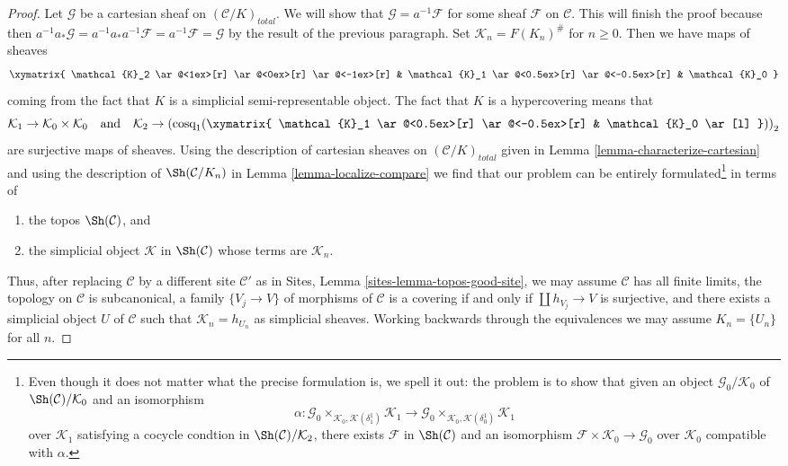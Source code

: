 \begin{proof}
\medskip\noindent
Let $\mathcal{G}$ be a cartesian sheaf on $(\mathcal{C}/K)_{total}$.
We will show that $\mathcal{G} = a^{-1}\mathcal{F}$ for some sheaf
$\mathcal{F}$ on $\mathcal{C}$. This will finish the proof because
then $a^{-1}a_*\mathcal{G} = a^{-1}a_*a^{-1}\mathcal{F} =
a^{-1}\mathcal{F} = \mathcal{G}$ by the result of the previous paragraph.
Set $\mathcal{K}_n = F(K_n)^\#$ for $n \geq 0$. Then we have maps of sheaves
$$
\xymatrix{
\mathcal{K}_2
\ar@<1ex>[r]
\ar@<0ex>[r]
\ar@<-1ex>[r]
&
\mathcal{K}_1
\ar@<0.5ex>[r]
\ar@<-0.5ex>[r]
&
\mathcal{K}_0
}
$$
coming from the fact that $K$ is a simplicial semi-representable object.
The fact that $K$ is a hypercovering means that
$$
\mathcal{K}_1 \to \mathcal{K}_0 \times \mathcal{K}_0
\quad\text{and}\quad
\mathcal{K}_2 \to
\left(\text{cosq}_1(
\xymatrix{
\mathcal{K}_1
\ar@<0.5ex>[r]
\ar@<-0.5ex>[r]
&
\mathcal{K}_0 \ar[l]
})\right)_2
$$
are surjective maps of sheaves. Using the description of cartesian sheaves on
$(\mathcal{C}/K)_{total}$ given in Lemma \ref{lemma-characterize-cartesian}
and using the description of $\Sh(\mathcal{C}/K_n)$ in
Lemma \ref{lemma-localize-compare}
we find that our problem can be entirely formulated\footnote{Even though it
does not matter what the precise formulation is, we spell it out:
the problem is to show that given an object
$\mathcal{G}_0/\mathcal{K}_0$ of $\Sh(\mathcal{C})/\mathcal{K}_0$
and an isomorphism
$$
\alpha :
\mathcal{G}_0 \times_{\mathcal{K}_0, \mathcal{K}(\delta^1_1)} \mathcal{K}_1 \to
\mathcal{G}_0 \times_{\mathcal{K}_0, \mathcal{K}(\delta^1_0)} \mathcal{K}_1
$$
over $\mathcal{K}_1$ satisfying a cocycle condtion in
$\Sh(\mathcal{C})/\mathcal{K}_2$, there exists
$\mathcal{F}$ in $\Sh(\mathcal{C})$ and an isomorphism
$\mathcal{F} \times \mathcal{K}_0 \to \mathcal{G}_0$ over $\mathcal{K}_0$
compatible with $\alpha$.} in terms of
\begin{enumerate}
\item the topos $\Sh(\mathcal{C})$, and
\item the simplicial object $\mathcal{K}$ in $\Sh(\mathcal{C})$
whose terms are $\mathcal{K}_n$.
\end{enumerate}
Thus, after replacing $\mathcal{C}$ by a different site $\mathcal{C}'$
as in Sites, Lemma \ref{sites-lemma-topos-good-site}, we may assume
$\mathcal{C}$ has all finite limits,
the topology on $\mathcal{C}$ is subcanonical,
a family $\{V_j \to V\}$ of morphisms of $\mathcal{C}$
is a covering if and only if $\coprod h_{V_j} \to V$ is surjective, and
there exists a simplicial object $U$ of $\mathcal{C}$
such that $\mathcal{K}_n = h_{U_n}$ as simplicial sheaves.
Working backwards through the equivalences we may assume
$K_n = \{U_n\}$ for all $n$.


\end{proof}
